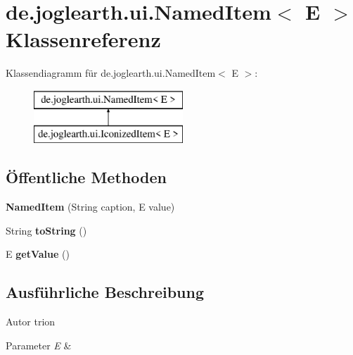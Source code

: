 \section{de.\-joglearth.\-ui.\-Named\-Item$<$ E $>$ Klassenreferenz}
\label{classde_1_1joglearth_1_1ui_1_1_named_item_3_01_e_01_4}
Klassendiagramm für de.\-joglearth.\-ui.\-Named\-Item$<$ E $>$\-:\begin{figure}[H]
\begin{center}
\leavevmode
\includegraphics[height=2.000000cm]{classde_1_1joglearth_1_1ui_1_1_named_item_3_01_e_01_4}
\end{center}
\end{figure}
\subsection*{Öffentliche Methoden}
\begin{DoxyCompactItemize}
\item 
{\bfseries Named\-Item} (String caption, E value)\label{classde_1_1joglearth_1_1ui_1_1_named_item_3_01_e_01_4_a7a4c9c32286b665eeadbac079cb43390}

\item 
String {\bfseries to\-String} ()\label{classde_1_1joglearth_1_1ui_1_1_named_item_3_01_e_01_4_aad33c70bdfe3d07be8df933a9ad7dc2f}

\item 
E {\bfseries get\-Value} ()\label{classde_1_1joglearth_1_1ui_1_1_named_item_3_01_e_01_4_a2303af63ccfccf5617c5cbc5658ca36d}

\end{DoxyCompactItemize}


\subsection{Ausführliche Beschreibung}
\begin{DoxyAuthor}{Autor}
trion
\end{DoxyAuthor}

\begin{DoxyParams}{Parameter}
{\em E} & \\
\hline
\end{DoxyParams}
